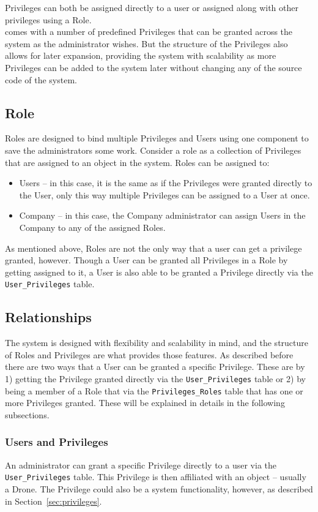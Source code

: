 Privileges can both be assigned directly to a user or assigned along with other privileges using a Role. \\

\projectname{} comes with a number of predefined Privileges that can be granted across the system as the administrator wishes.
But the structure of the Privileges also allows for later expansion, providing the system with scalability as more Privileges can be added to the system later without changing any of the source code of the system.


\subsection{Role}
Roles are designed to bind multiple Privileges and Users using one component to save the administrators some work.
Consider a role as a collection of Privileges that are assigned to an object in the system.
Roles can be assigned to:

\begin{itemize}
    \item Users -- in this case, it is the same as if the Privileges were granted directly to the User, only this way multiple Privileges can be assigned to a User at once.
    \item Company -- in this case, the Company administrator can assign Users in the Company to any of the assigned Roles.
\end{itemize}

As mentioned above, Roles are not the only way that a user can get a privilege granted, however.
Though a User can be granted all Privileges in a Role by getting assigned to it, a User is also able to be granted a Privilege directly via the \verb+User_Privileges+ table.


\subsection{Relationships}
The system is designed with flexibility and scalability in mind, and the structure of Roles and Privileges are what provides those features.
As described before there are two ways that a User can be granted a specific Privilege.
These are by 1) getting the Privilege granted directly via the \verb+User_Privileges+ table or 2) by being a member of a Role that via the \verb+Privileges_Roles+ table that has one or more Privileges granted.
These will be explained in details in the following subsections.


\subsubsection{Users and Privileges}
\label{sec:users_and_privileges}
An administrator can grant a specific Privilege directly to a user via the \verb+User_Privileges+ table.
This Privilege is then affiliated with an object -- usually a Drone.
The Privilege could also be a system functionality, however, as described in Section~\ref{sec:privileges}. \\

